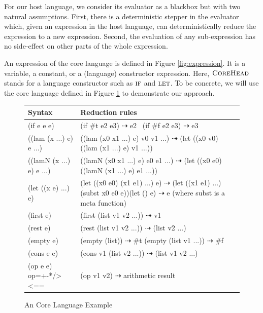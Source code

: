 For our host language, we consider its evaluator as a blackbox  but with two natural assumptions. First, there is a deterministic stepper in the evaluator which, given an expression in the host language, can deterministically reduce the expression to a new expression. Second, the evaluation of any sub-expression has no side-effect on other parts of the whole expression.

An expression of the core language is defined in Figure \ref{fig:expression}. It is a variable, a constant, or a (language) constructor expression. Here, $\mbox{\sc CoreHead}$ stands for a language constructor such as $\mbox{\sc if}$ and $\mbox{\sc let}$. To be concrete, we will use the core language defined in Figure \ref{fig:core} to demonstrate our approach.

\begin{figure}[t]
\begin{center}
\begin{tabularx}{.96\textwidth}%
{|>{\setlength{\hsize}{.5\hsize}\centering\arraybackslash}X  |>{\setlength{\hsize}{1.5\hsize}\centering\arraybackslash}X|}
\hline
Syntax & Reduction rules \\ \hline
(if e e e) &\qquad\qquad\qquad(if \#t e2 e3) $\dashrightarrow$ e2 \newline ~(if \#f e2 e3) $\dashrightarrow$ e3\\ \hline
((lam (x ...) e) e ...) & ((lam (x0 x1 ...) e) v0 v1 ...) $\dashrightarrow$ (let ((x0 v0) ((lam (x1 ...) e) v1 ...))\\ \hline
((lamN (x ...) e) e ...) & ((lamN (x0 x1 ...) e) e0 e1 ...) $\dashrightarrow$ (let ((x0 e0) ((lamN (x1 ...) e) e1 ...))\\ \hline
(let ((x e) ...) e) & (let ((x0 e0) (x1 e1) ...) e) $\dashrightarrow$ (let ((x1 e1) ...) (subst x0 e0 e))\newline (let () e)  $\dashrightarrow$ e (where subst is a meta function)\\ \hline
(first e) & (first (list v1 v2 ...)) $\dashrightarrow$ v1\\ \hline
(rest e) & (rest (list v1 v2 ...)) $\dashrightarrow$ (list v2 ...)\\ \hline
(empty e) & \qquad\qquad\qquad(empty (list)) $\dashrightarrow$ \#t \newline (empty (list v1 ...)) $\dashrightarrow$ \#f\\ \hline
(cons e e) & (cons v1 (list v2 ...)) $\dashrightarrow$ (list v1 v2 ...)\\ \hline
(op e e) \newline op=+-*/><== & (op v1 v2) $\dashrightarrow$ arithmetic result\\ \hline
\end{tabularx}
\end{center}
\caption{An Core Language Example}
\label{fig:core}
\end{figure}


